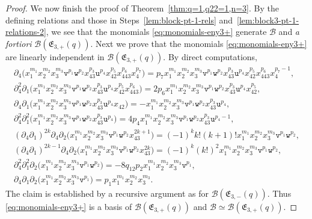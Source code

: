 \documentclass[10pt,a4paper]{amsart}
\numberwithin{equation}{section}
\newcommand{\toba}{\mathscr B}
\newcommand{\ut}{\mathtt{u}}
\newcommand{\vt}{\mathtt{v}}
\newcommand{\wt}{\mathtt{w}}
\newcommand{\eny}{\mathfrak{E}}
\begin{document}
\begin{proof}
We now finish the proof of Theorem~\ref{thm:q=1,q22=1,n=3}.
By the defining relations and those in Steps~\ref{lem:block-pt-1-rels} and~\ref{lem:block3-pt-1-relations-2}, we see that the monomials \eqref{eq:monomials-eny3+} generate $\toba$ and \emph{a fortiori} $\toba(\eny_{3,+}(q))$.
Next we prove that the monomials \eqref{eq:monomials-eny3+} are linearly independent in $\toba(\eny_{3,+}(q))$.
By direct computations,
\begin{gather*}
\partial_4 \big(x_1^{m_1} x_2^{m_2} x_3^{m_3} \vt^{p_1} \wt^{p_2} x_{43}^{p_3} \ut^{p_4} x_{42}^{p_5} x_{443}^{p_6} x_4^{p_7}\big)
 = p_7 x_1^{m_1} x_2^{m_2} x_3^{m_3} \vt^{p_1} \wt^{p_2} x_{43}^{p_3} \ut^{p_4} x_{42}^{p_5} x_{443}^{p_6} x_4^{p_7-1},
\\[.5mm]
\partial_4^2 \partial_1 \big(x_1^{m_1} x_2^{m_2} x_3^{m_3} \vt^{p_1} \wt^{p_2} x_{43}^{p_3} \ut^{p_4} x_{42}^{p_5} x_{443}^{p_6}\big)
= 2p_6 x_1^{m_1} x_2^{m_2} x_3^{m_3} \vt^{p_1} \wt^{p_2} x_{43}^{p_3} \ut^{p_4} x_{42}^{p_5},
\\[.5mm]
\partial_4 \partial_1 \big(x_1^{m_1} x_2^{m_2} x_3^{m_3} \vt^{p_1} \wt^{p_2} x_{43}^{p_3} \ut^{p_4} x_{42} \big) =
-x_1^{m_1} x_2^{m_2} x_3^{m_3} \vt^{p_1} \wt^{p_2} x_{43}^{p_3} \ut^{p_4},
\\[.5mm]
\partial_4^2 \partial_1^2 \big( x_1^{m_1} x_2^{m_2} x_3^{m_3} \vt^{p_1} \wt^{p_2} x_{43}^{p_3} \ut^{p_4} \big) = 4p_4 x_1^{m_1} x_2^{m_2} x_3^{m_3} \vt^{p_1} \wt^{p_2} x_{43}^{p_3} \ut^{p_4-1},
\\[.5mm]
(\partial_4 \partial_1)^{2k} \partial_4 \partial_2 \big( x_1^{m_1} x_2^{m_2} x_3^{m_3} \vt^{p_1} \wt^{p_2} x_{43}^{2k+1}\big) = (-1)^k k!(k+1)! x_1^{m_1} x_2^{m_2} x_3^{m_3} \vt^{p_1} \wt^{p_2},
\\[.5mm]
(\partial_4 \partial_1)^{2k-1} \partial_4 \partial_2 \big( x_1^{m_1} x_2^{m_2} x_3^{m_3} \vt^{p_1} \wt^{p_2} x_{43}^{2k}\big) =
(-1)^k (k!)^2 x_1^{m_1} x_2^{m_2} x_3^{m_3} \vt^{p_1} \wt^{p_2},
\\[.5mm]
\partial_4^2 \partial_1^2 \partial_2 \big( x_1^{m_1} x_2^{m_2} x_3^{m_3} \vt^{p_1} \wt^{p_2}\big) =
-8q_{12}p_2 x_1^{m_1} x_2^{m_2} x_3^{m_3} \vt^{p_1},
\\[.5mm]
\partial_4 \partial_1 \partial_2 \big( x_1^{m_1} x_2^{m_2} x_3^{m_3} \vt^{p_1}\big) =
p_1 x_1^{m_1} x_2^{m_2} x_3^{m_3}.
\end{gather*}
The claim is established by a recursive argument as for $\toba(\eny_{3,-}(q))$. Thus \eqref{eq:monomials-eny3+} is a basis of $\toba(\eny_{3,+}(q))$ and $\toba \simeq \toba(\eny_{3,+}(q))$.
\end{proof}
\end{document}
